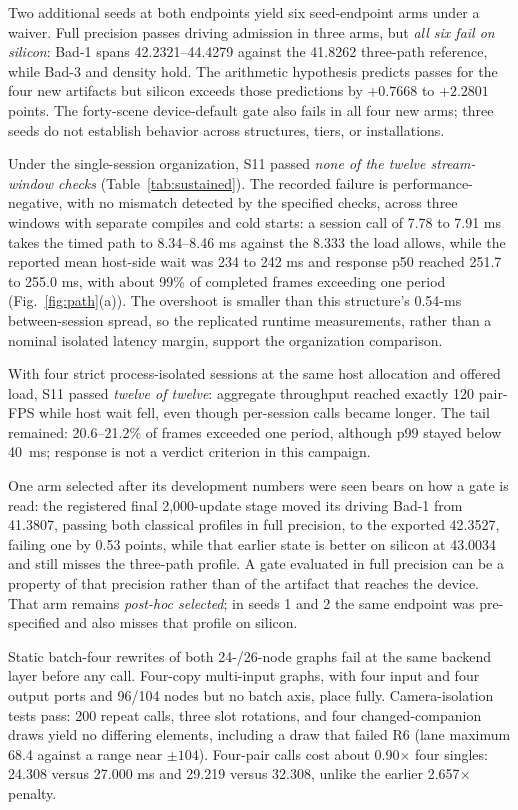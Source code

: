 \documentclass[sigconf,review,anonymous]{acmart}
\begin{document}
Two additional seeds at both endpoints yield six seed-endpoint arms under a waiver. Full precision passes driving admission in three arms, but \emph{all six fail on silicon}: Bad-1 spans 42.2321--44.4279 against the 41.8262 three-path reference, while Bad-3 and density hold. The arithmetic hypothesis predicts passes for the four new artifacts but silicon exceeds those predictions by $+0.7668$ to $+2.2801$ points. The forty-scene device-default gate also fails in all four new arms; three seeds do not establish behavior across structures, tiers, or installations.

Under the single-session organization, S11 passed \emph{none of the twelve stream-window checks} (Table~\ref{tab:sustained}). The recorded failure is performance-negative, with no mismatch detected by the specified checks, across three windows with separate compiles and cold starts: a session call of 7.78 to 7.91 ms takes the timed path to 8.34--8.46 ms against the 8.333 the load allows, while the reported mean host-side wait was 234 to 242 ms and response p50 reached 251.7 to 255.0 ms, with about 99\% of completed frames exceeding one period (Fig.~\ref{fig:path}(a)). The overshoot is smaller than this structure's 0.54-ms between-session spread, so the replicated runtime measurements, rather than a nominal isolated latency margin, support the organization comparison.

With four strict process-isolated sessions at the same host allocation and offered load, S11 passed \emph{twelve of twelve}: aggregate throughput reached exactly 120 pair-FPS while host wait fell, even though per-session calls became longer. The tail remained: 20.6--21.2\% of frames exceeded one period, although p99 stayed below 40~ms; response is not a verdict criterion in this campaign.

One arm selected after its development numbers were seen bears on how a gate is read: the registered final 2,000-update stage moved its driving Bad-1 from 41.3807, passing both classical profiles in full precision, to the exported 42.3527, failing one by 0.53 points, while that earlier state is better on silicon at 43.0034 and still misses the three-path profile. A gate evaluated in full precision can be a property of that precision rather than of the artifact that reaches the device. That arm remains \emph{post-hoc selected}; in seeds 1 and 2 the same endpoint was pre-specified and also misses that profile on silicon. 

Static batch-four rewrites of both 24-/26-node graphs fail at the same backend layer before any call. Four-copy multi-input graphs, with four input and four output ports and 96/104 nodes but no batch axis, place fully. Camera-isolation tests pass: 200 repeat calls, three slot rotations, and four changed-companion draws yield no differing elements, including a draw that failed R6 (lane maximum 68.4 against a range near $\pm104$). Four-pair calls cost about 0.90$\times$ four singles: 24.308 versus 27.000 ms and 29.219 versus 32.308, unlike the earlier 2.657$\times$ penalty.
\end{document}
